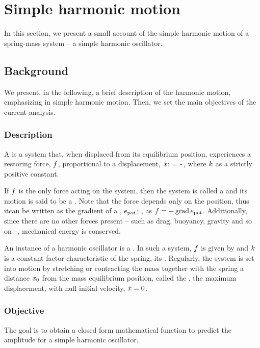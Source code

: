 \section{Simple harmonic motion}
In this section, we present a small account of the simple harmonic motion of a spring-mass system -- a simple harmonic oscillator.


\subsection{Background}
We present, in the following, a brief description of the harmonic motion, emphasizing in simple harmonic motion. Then, we set the main objectives of the current analysis.


\subsubsection{Description}
A  is a system that, when displaced from its equilibrium position, experiences a restoring force, $f$, proportional to a displacement, $x$:
\beq
\force = -\kspring\disp\,,
\eeq
where $k$ as a strictly positive constant.

If $f$ is the only force acting on the system, then the system is called a  and its motion is said to be a . Note that the force depends only on the position, thus itcan be written as the gradient of a , $e_\text{pot}$; \ie, as $f = -\operatorname{grad}e_\text{pot}$. Additionally, since there are no other forces present -- such as drag, buoyancy, gravity and so on --, mechanical energy is conserved.

An instance of a harmonic oscillator is a . In such a system, $f$ is given by  and $k$ is a constant factor characteristic of the spring, its . Regularly, the system is set into motion by stretching or contracting the mass together with the spring a distance $x_0$ from the mass equilibrium position, called the , the maximum displacement, with null initial velocity, $\dot{x} = 0$.


\subsubsection{Objective}
The goal is to obtain a closed form mathematical function to predict the amplitude for a simple harmonic oscillator.


